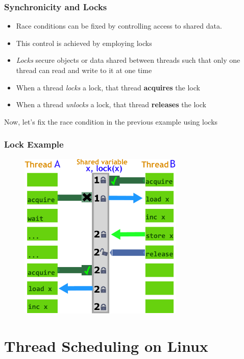 \documentclass{beamer}
\newcommand{\linespace}{\vskip 0.25cm}
\begin{document}
\begin{frame}
\frametitle{Synchronicity and Locks}

\begin{itemize}
	\item Race conditions can be fixed by controlling access to shared data.
	\item This control is achieved by employing locks
	
	\linespace
	
	\item \emph{Locks} secure objects or data shared between threads such that only one thread can read and write to it at one time

	\linespace

	\item When a thread \emph{locks} a lock, that thread \textbf{acquires} the lock
	\item When a thread \emph{unlocks} a lock, that thread \textbf{releases} the lock
\end{itemize}

Now, let's fix the race condition in the previous example using locks

\end{frame}

\begin{frame}
\frametitle{Lock Example}
	\begin{figure}
		\includegraphics[width=0.7\textwidth]{Illustrations/Lock}
		\label{fig:lock}
	\end{figure}
\end{frame}

\section[Thread Scheduling]{Thread Scheduling on Linux}
\end{document}
